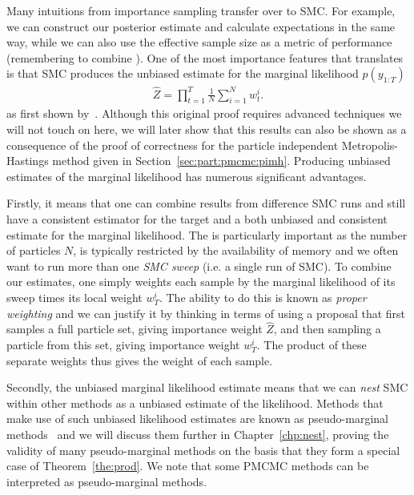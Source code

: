 Many intuitions from importance sampling transfer over to SMC.  For example, we can construct our posterior
estimate and calculate expectations in the same way, while we can also use the effective sample size as
a metric of performance (remembering to combine ). 
One of the most importance features that translates is that SMC produces the
unbiased estimate for the marginal likelihood $p(y_{1:T})$
\begin{align}
\label{eq:part:ML}
\hat Z = \prod_{t=1}^T \frac{1}{N} \sum_{i=1}^N w_{t}^{i}.
\end{align}
as first shown by~\cite{del2004feynman}.  Although this original
proof requires advanced techniques we will not touch on here, we will later show that this results can also be shown
as a consequence of the proof of correctness for the particle independent Metropolis-Hastings method
given in Section~\ref{sec:part:pmcmc:pimh}.  Producing unbiased
estimates of the marginal likelihood has numerous significant advantages.  

Firstly, it means that one can combine
results from difference SMC runs and still have a consistent estimator for the target and a both unbiased and
consistent estimate for the marginal likelihood.
The is particularly important as the number of particles $N$, is typically restricted by the availability of memory
and we often want to run more than one \emph{SMC sweep} (i.e. a single run of SMC).
To combine our estimates, one simply weights each sample by the marginal likelihood of its sweep times
its local weight $w_T^i$.  The ability to do this is known as \emph{proper weighting} and we can justify it by
thinking in terms of using a proposal that first samples a full particle set, giving importance weight $\hat Z$, and then sampling a particle
from this set, giving importance weight $w_T^i$.  The product of these separate weights thus gives the weight of
each sample.  

Secondly, the unbiased marginal likelihood estimate means that we can \emph{nest} SMC within other 
methods as a unbiased estimate of the likelihood.
Methods that make use of such unbiased likelihood estimates are known as pseudo-marginal
methods~\citep{andrieu2009pseudo,andrieu2015convergence,andersson2015nested}
	 and we will discuss them further in Chapter~\ref{chp:nest},
proving the validity of many pseudo-marginal methods on the basis that they form a special case of Theorem~\ref{the:prod}.
We note that some PMCMC methods can be interpreted as pseudo-marginal methods.
%

